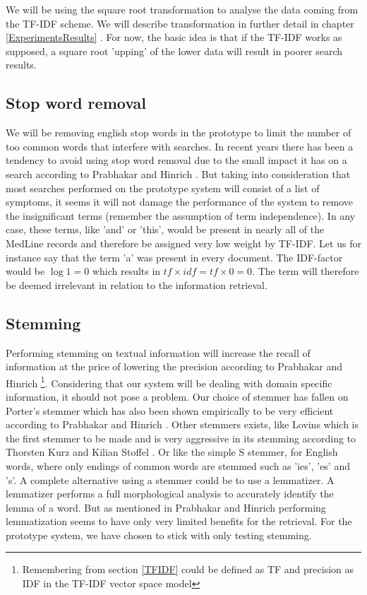 We will be using the square root transformation to analyse the data
coming from the TF-IDF scheme. We will describe transformation in
further detail in chapter \ref{ExperimentsResults} . For now, the basic idea is that if the TF-IDF
works as supposed, a square root 'upping' of the lower data will
result in poorer search results.

\subsection{Stop word removal}

We will be removing english stop words in the prototype to limit the
number of too common words that interfere with searches. In recent
years there has been a tendency to avoid using stop word removal due
to the small impact it has on a search according to Prabhakar and
Hinrich \cite{IntroIR2009}. But taking into consideration that most
searches performed on the prototype system will consist of a list of
symptoms, it seems it will not damage the performance of the system to
remove the insignificant terms (remember the assumption of term
independence). In any case, these terms, like 'and' or 'this', would
be present in nearly all of the MedLine records and therefore be
assigned very low weight by TF-IDF. Let us for instance say that the
term 'a' was present in every document. The IDF-factor would be $\log
1 = 0$ which results in $tf \times idf = tf \times 0 = 0$. The term
will therefore be deemed irrelevant in relation to the information
retrieval.

\subsection{Stemming}

Performing stemming on textual information will increase the recall of
information at the price of lowering the precision according to
Prabhakar and Hinrich \cite{IntroIR2009}\footnote{Remembering from
  section \ref{TFIDF} could be defined as TF and precision as IDF in
  the TF-IDF vector space model}. Considering that our system will be
dealing with domain specific information, it should not pose a
problem. Our choice of stemmer has fallen on Porter's stemmer which
has also been shown empirically to be very efficient according to
Prabhakar and Hinrich \cite{IntroIR2009}. Other stemmers exists, like
Lovins which is the first stemmer to be made and is very aggressive in
its stemming according to Thorsten Kurz and Kilian Stoffel
\cite{Kurz2002309}. Or like the simple S stemmer, for English words,
where only endings of common words are stemmed such as 'ies', 'es' and
's'. A complete alternative using a stemmer could be to use a
lemmatizer. A lemmatizer performs a full morphological analysis to
accurately identify the lemma of a word. But as mentioned in Prabhakar
and Hinrich \cite{IntroIR2009} performing lemmatization seems to have
only very limited benefits for the retrieval. For the prototype
system, we have chosen to stick with only testing stemming.

